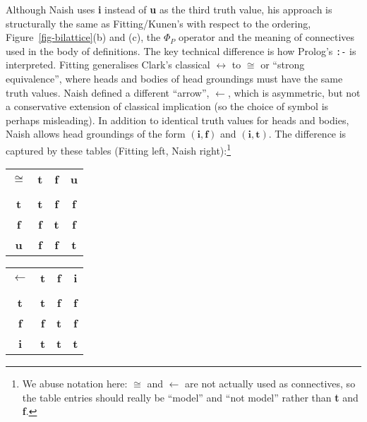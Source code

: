 \documentclass{tlp}
\begin{document}
Although Naish uses \textbf{i} instead of \textbf{u} as the third truth
value, his approach is structurally the same as Fitting/Kunen's with
respect to the ordering, Figure~\ref{fig-bilattice}(b) and (c), the
$\Phi_P$ operator and the meaning of connectives used in
the body of definitions.  The key technical
difference is how Prolog's \texttt{:-}
is interpreted.  Fitting generalises Clark's classical $\leftrightarrow$
to $\cong$ or ``strong equivalence'', where heads and bodies of head
groundings must have the same truth values.
Naish defined a different ``arrow'', $\leftarrow$,
which is asymmetric, but not a conservative extension of classical
implication (so the choice of symbol is perhaps misleading).
In addition to identical truth values for heads and
bodies, Naish allows head groundings of the form $(\mathbf{i}, \mathbf{f})$
and $(\mathbf{i}, \mathbf{t})$.
The difference is captured by these tables (Fitting left, Naish
right):\footnote{We abuse notation here: $\cong$ and $\leftarrow$ are not
actually used as connectives, so the table entries should really be ``model''
and ``not model'' rather than \textbf{t} and \textbf{f}.}
\smallskip

\begin{center}
\begin{minipage}{0.48\textwidth}
\begin{tabular}{|c||c|c|c|}
\cline{1-4}
$\cong$ & \textbf{t}  & \textbf{f} & \textbf{u} \\
\cline{1-4}
\vspace{-3.9mm} & & & \\
\cline{1-4}
\textbf{t}   & \textbf{t}  & \textbf{f} & \textbf{f} \\
\cline{1-4}
\textbf{f}   & \textbf{f}  & \textbf{t} & \textbf{f} \\
\cline{1-4}
\textbf{u}   & \textbf{f}  & \textbf{f} & \textbf{t} \\
\cline{1-4}
\end{tabular}
\end{minipage}
\begin{minipage}{0.48\textwidth}
\begin{tabular}{|c||c|c|c|}
\cline{1-4}
$\leftarrow$ & \textbf{t}  & \textbf{f} & \textbf{i} \\
\cline{1-4}
\vspace{-3.9mm} & & & \\
\cline{1-4}
\textbf{t}   & \textbf{t}  & \textbf{f} & \textbf{f} \\
\cline{1-4}
\textbf{f}   & \textbf{f}  & \textbf{t} & \textbf{f} \\
\cline{1-4}
\textbf{i}   & \textbf{t}  & \textbf{t} & \textbf{t} \\
\cline{1-4}
\end{tabular}
\end{minipage}
\end{center}
\end{document}
